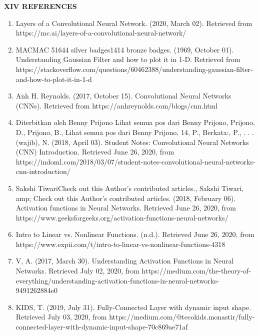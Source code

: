 \documentclass{IEEEtran}
\begin{document}
\begin{center}
\textbf{XIV REFERENCES}    
\end{center}
\begin{enumerate}
\item Layers of a Convolutional Neural Network. (2020, March 02). Retrieved from https://mc.ai/layers-of-a-convolutional-neural-network/

\item MACMAC 51644 silver badges1414 bronze badges. (1969, October 01). Understanding Gaussian Filter and how to plot it in 1-D. Retrieved from https://stackoverflow.com/questions/60462388/understanding-gaussian-filter-and-how-to-plot-it-in-1-d

\item Anh H. Reynolds. (2017, October 15). Convolutional Neural Networks (CNNs). Retrieved from https://anhreynolds.com/blogs/cnn.html

\item Diterbitkan oleh Benny Prijono Lihat semua pos dari Benny Prijono, Prijono, D., Prijono, B., Lihat semua pos dari Benny Prijono, 14, P., Berkata:, P., . . . (wajib), N. (2018, April 03). Student Notes: Convolutional Neural Networks (CNN) Introduction. Retrieved June 26, 2020, from https://indoml.com/2018/03/07/student-notes-convolutional-neural-networks-cnn-introduction/

\item Sakshi TiwariCheck out this Author's contributed articles., Sakshi Tiwari, amp; Check out this Author's contributed articles. (2018, February 06). Activation functions in Neural Networks. Retrieved June 26, 2020, from https://www.geeksforgeeks.org/activation-functions-neural-networks/

\item Intro to Linear vs. Nonlinear Functions. (n.d.). Retrieved June 26, 2020, from https://www.expii.com/t/intro-to-linear-vs-nonlinear-functions-4318

\item V, A. (2017, March 30). Understanding Activation Functions in Neural Networks. Retrieved July 02, 2020, from https://medium.com/the-theory-of-everything/understanding-activation-functions-in-neural-networks-9491262884e0

\item KIDS, T. (2019, July 31). Fully-Connected Layer with dynamic input shape. Retrieved July 03, 2020, from https://medium.com/@tecokids.monastir/fully-connected-layer-with-dynamic-input-shape-70c869ae71af


\end{enumerate}
\end{document}
